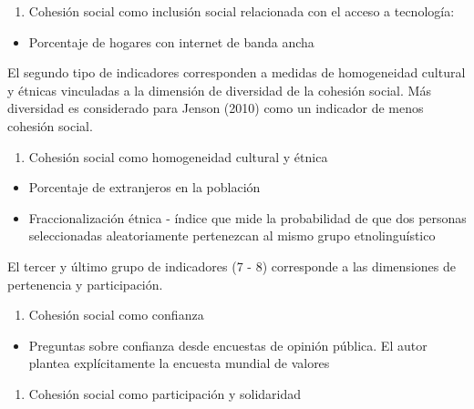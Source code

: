\documentclass[
  12pt,
]{book}
\providecommand{\tightlist}{%
  \setlength{\itemsep}{0pt}\setlength{\parskip}{0pt}}
\begin{document}
\begin{enumerate}
\def\labelenumi{\arabic{enumi}.}
\setcounter{enumi}{4}
\tightlist
\item
  Cohesión social como inclusión social relacionada con el acceso a tecnología:
\end{enumerate}

\begin{itemize}
\tightlist
\item
  Porcentaje de hogares con internet de banda ancha
\end{itemize}

El segundo tipo de indicadores corresponden a medidas de homogeneidad cultural y étnicas vinculadas a la dimensión de diversidad de la cohesión social. Más diversidad es considerado para Jenson (2010) como un indicador de menos cohesión social.

\begin{enumerate}
\def\labelenumi{\arabic{enumi}.}
\setcounter{enumi}{5}
\tightlist
\item
  Cohesión social como homogeneidad cultural y étnica
\end{enumerate}

\begin{itemize}
\tightlist
\item
  Porcentaje de extranjeros en la población
\item
  Fraccionalización étnica - índice que mide la probabilidad de que dos personas seleccionadas aleatoriamente pertenezcan al mismo grupo etnolinguístico
\end{itemize}

El tercer y último grupo de indicadores (7 - 8) corresponde a las dimensiones de pertenencia y participación.

\begin{enumerate}
\def\labelenumi{\arabic{enumi}.}
\setcounter{enumi}{6}
\tightlist
\item
  Cohesión social como confianza
\end{enumerate}

\begin{itemize}
\tightlist
\item
  Preguntas sobre confianza desde encuestas de opinión pública. El autor plantea explícitamente la encuesta mundial de valores
\end{itemize}

\begin{enumerate}
\def\labelenumi{\arabic{enumi}.}
\setcounter{enumi}{7}
\tightlist
\item
  Cohesión social como participación y solidaridad
\end{enumerate}
\end{document}
